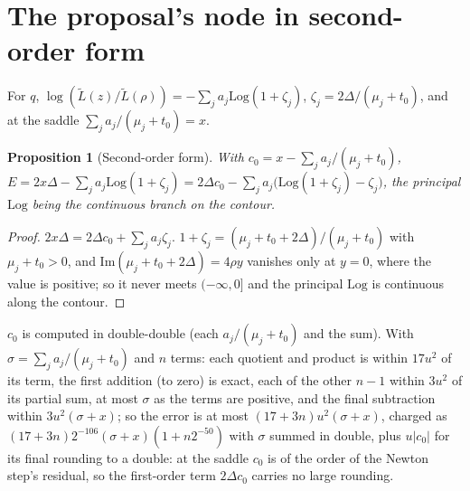 \documentclass[11pt]{article}
\newtheorem{proposition}[theorem]{Proposition}
\theoremstyle{definition}
\newcommand{\Lt}{\widetilde L}
\newcommand{\Log}{\mathrm{Log}}
\begin{document}
\section{The proposal's node in second-order form}\label{sec:qnode}

For $q$, $\log(\Lt(z)/\Lt(\rho))=-\sum_ja_j\Log(1+\zeta_j)$, $\zeta_j=2\Delta/(\mu_j+t_0)$, and at the saddle
$\sum_ja_j/(\mu_j+t_0)=x$.

\begin{proposition}[Second-order form]\label{prop:qnode}
With $c_0=x-\sum_ja_j/(\mu_j+t_0)$,
$E=2x\Delta-\sum_ja_j\Log(1+\zeta_j)=2\Delta c_0-\sum_ja_j\bigl(\Log(1+\zeta_j)-\zeta_j\bigr)$, the principal
$\Log$ being the continuous branch on the contour.
\end{proposition}
\begin{proof}
$2x\Delta=2\Delta c_0+\sum_ja_j\zeta_j$. $1+\zeta_j=(\mu_j+t_0+2\Delta)/(\mu_j+t_0)$ with $\mu_j+t_0>0$, and
$\mathrm{Im}(\mu_j+t_0+2\Delta)=4\rho y$ vanishes only at $y=0$, where the value is positive; so it never meets
$(-\infty,0]$ and the principal $\Log$ is continuous along the contour.
\end{proof}
$c_0$ is computed in double-double (each $a_j/(\mu_j+t_0)$ and the sum). With $\sigma=\sum_ja_j/(\mu_j+t_0)$ and
$n$ terms: each quotient and product is within $17u^2$ of its term, the first addition (to zero) is exact, each of the
other $n-1$ within $3u^2$ of its partial sum, at most $\sigma$ as the terms are positive, and the final subtraction
within $3u^2(\sigma+x)$; so the error is at most $(17+3n)u^2(\sigma+x)$, charged as
$(17+3n)2^{-106}(\sigma+x)(1+n2^{-50})$ with $\sigma$ summed in double, plus $u|c_0|$ for its final rounding to a
double: at the saddle $c_0$ is of the order of the
Newton step's residual, so the first-order term $2\Delta c_0$ carries no large rounding.
\end{document}
